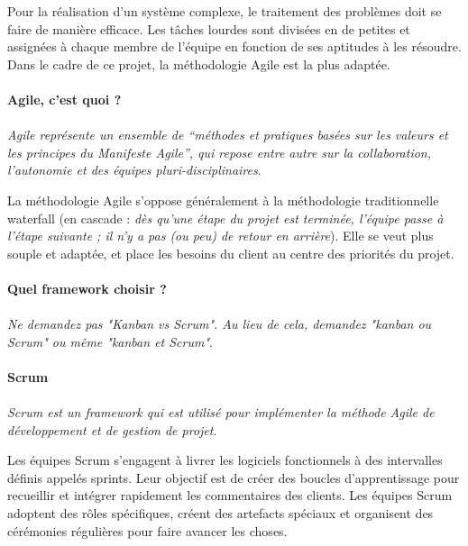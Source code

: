Pour la réalisation d'un système complexe, le traitement des problèmes doit se faire 
        de manière efficace. Les tâches lourdes sont divisées en de petites et assignées 
        à chaque membre de l'équipe  en fonction de ses aptitudes à les résoudre. Dans le cadre de ce projet,
        la méthodologie Agile est la plus adaptée.

        \paragraph{Agile, c'est quoi ?}
        \paragraph{}
        \textit{Agile représente un ensemble de “méthodes et pratiques basées sur 
        les valeurs et les principes du Manifeste Agile”, qui repose entre autre sur 
        la collaboration, l’autonomie et des équipes pluri-disciplinaires}\cite{Littlefield2017}.
        \par
        La méthodologie Agile s'oppose généralement à la méthodologie traditionnelle waterfall (en cascade :
        \textit{dès qu'une étape du projet est terminée, l'équipe passe à l'étape suivante ; il n'y a pas (ou peu) 
        de retour en arrière}\cite{david2017}). Elle se veut plus souple 
        et adaptée, et place les besoins du client au centre des priorités du projet.

        \paragraph{Quel framework choisir ?}
        \paragraph{}
        \textit{Ne demandez pas "Kanban vs Scrum". Au lieu de cela, demandez "kanban ou Scrum" 
        ou même "kanban et Scrum"}\cite{Rehkopf}.
        \par
        \paragraph{Scrum}
        \paragraph{}
        \textit{Scrum est un framework qui est utilisé pour implémenter la méthode 
        Agile de développement et de gestion de projet}\cite{Littlefield2017}.
        \par
        Les équipes Scrum s'engagent à livrer les logiciels fonctionnels à des intervalles définis 
        appelés sprints. Leur objectif est de créer des boucles d'apprentissage pour 
        recueillir et intégrer rapidement les commentaires des clients. Les équipes Scrum 
        adoptent des rôles spécifiques, créent des artefacts spéciaux et organisent des cérémonies 
        régulières pour faire avancer les choses. 
        
